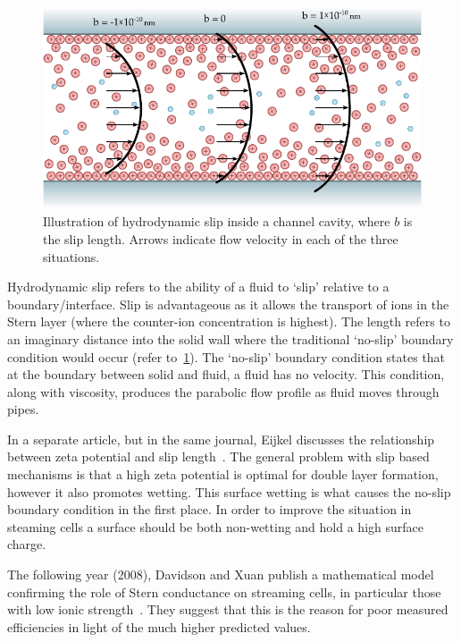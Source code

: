   \begin{figure}
    \centering
    \includegraphics[height=6cm]{content/pt1/graphics/HydrodynamicSlip}
    \caption{\label{fig:HydrodynamicSlip}Illustration of hydrodynamic slip inside a channel cavity, where $b$ is the slip length. Arrows indicate flow velocity in each of the three situations.}
  \end{figure}

  Hydrodynamic slip refers to the ability of a fluid to `slip' relative to a boundary/interface.
  Slip is advantageous as it allows the transport of ions in the Stern layer (where the counter-ion concentration is highest).
  The length refers to an imaginary distance into the solid wall where the traditional `no-slip' boundary condition would occur (refer to~\cref{fig:HydrodynamicSlip}).
  The `no-slip' boundary condition states that at the boundary between solid and fluid, a fluid has no velocity.
  This condition, along with viscosity, produces the parabolic flow profile as fluid moves through pipes.

  In a separate article, but in the same journal, Eijkel discusses the relationship between zeta potential and slip length~\cite{Eijkel2007}.
  The general problem with slip based mechanisms is that a high zeta potential is optimal for double layer formation, however it also promotes wetting.
  This surface wetting is what causes the no-slip boundary condition in the first place.
  In order to improve the situation in steaming cells a surface should be both non-wetting and hold a high surface charge.

  The following year (2008), Davidson and Xuan publish a mathematical model confirming the role of Stern conductance on streaming cells, in particular those with low ionic strength~\cite{Davidson2008}.
  They suggest that this is the reason for poor measured efficiencies in light of the much higher predicted values.

